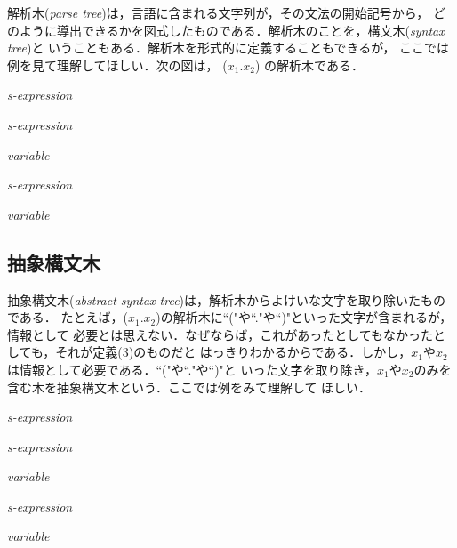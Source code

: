 \documentclass{jarticle}
\begin{document}
解析木({\it parse tree})は，言語に含まれる文字列が，その文法の開始記号から，
どのように導出できるかを図式したものである．解析木のことを，構文木({\it syntax tree})と
いうこともある．解析木を形式的に定義することもできるが，
ここでは例を見て理解してほしい．次の図は， ($x_1$.$x_2$) の解析木である．
\begin{center}
\GapDepth=20pt
\GapWidth=40pt
\begin{bundle}{{\it s-expression}}
\chunk{(}
\chunk
{
\begin{bundle}{{\it s-expression}}
\chunk
{
\begin{bundle}{{\it variable}}
\end{bundle}
}
\end{bundle}
}
\chunk
{
\begin{bundle}{{\it s-expression}}
\chunk
{
\begin{bundle}{{\it variable}}
\end{bundle}
}
\end{bundle}
}
\chunk{)}
\end{bundle}
\end{center}

\subsection{抽象構文木}

抽象構文木({\it abstract syntax tree})は，解析木からよけいな文字を取り除いたものである．
たとえば，($x_1$.$x_2$)の解析木に``("や``."や``)"といった文字が含まれるが，情報として
必要とは思えない．なぜならば，これがあったとしてもなかったとしても，それが定義(3)のものだと
はっきりわかるからである．しかし，$x_1$や$x_2$は情報として必要である．``("や``."や``)"と
いった文字を取り除き，$x_1$や$x_2$のみを含む木を抽象構文木という．ここでは例をみて理解して
ほしい．
\begin{center}
\GapDepth=20pt
\GapWidth=40pt
\begin{bundle}{{\it s-expression}}
\chunk
{
\begin{bundle}{{\it s-expression}}
\chunk
{
\begin{bundle}{{\it variable}}
\end{bundle}
}
\end{bundle}
}
\chunk
{
\begin{bundle}{{\it s-expression}}
\chunk
{
\begin{bundle}{{\it variable}}
\end{bundle}
}
\end{bundle}
}
\end{bundle}
\end{center}
\end{document}
